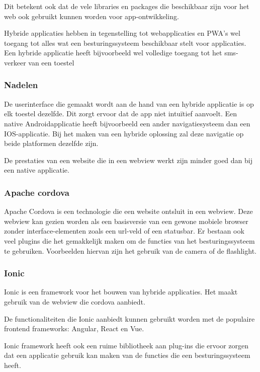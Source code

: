 		Dit betekent ook dat de vele libraries en packages die beschikbaar zijn voor het web ook gebruikt kunnen worden voor app-ontwikkeling.
		
		Hybride applicaties hebben in tegenstelling tot webapplicaties en PWA’s wel toegang tot alles wat een besturingssysteem beschikbaar stelt voor applicaties. Een hybride applicatie heeft bijvoorbeeld wel volledige toegang tot het sms-verkeer van een toestel 
		\autocite{Ionic2020}
	
	\subsubsection{Nadelen}
		De userinterface die gemaakt wordt aan de hand van een hybride applicatie is op elk toestel dezelfde. Dit zorgt ervoor dat de app niet intuïtief aanvoelt. Een native Androidapplicatie heeft bijvoorbeeld een ander navigatiesysteem dan een IOS-applicatie. Bij het maken van een hybride oplossing zal deze navigatie op beide platformen dezelfde zijn.
		
		De prestaties van een website die in een webview werkt zijn minder goed dan bij een native applicatie.
	
		\autocite{Asp2017}	

		
	\subsubsection{Apache cordova}
		Apache Cordova is een technologie die een website ontsluit in een webview. Deze webview kan gezien worden als een basisversie van een gewone mobiele browser zonder interface-elementen zoals een url-veld of een statusbar. Er bestaan ook veel plugins die het gemakkelijk maken om de functies van het besturingssysteem te gebruiken. Voorbeelden hiervan zijn het gebruik van de camera of de flashlight.
		
		
	\subsubsection{Ionic}
		Ionic is een framework voor het bouwen van hybride applicaties. Het maakt gebruik van de webview die cordova aanbiedt.
		
		De functionaliteiten die Ionic aanbiedt kunnen gebruikt worden met de populaire frontend frameworks: Angular, React en Vue.
		
		Ionic framework heeft ook een ruime bibliotheek aan plug-ins die ervoor zorgen dat een applicatie gebruik kan maken van de functies die een besturingssysteem heeft.
		
